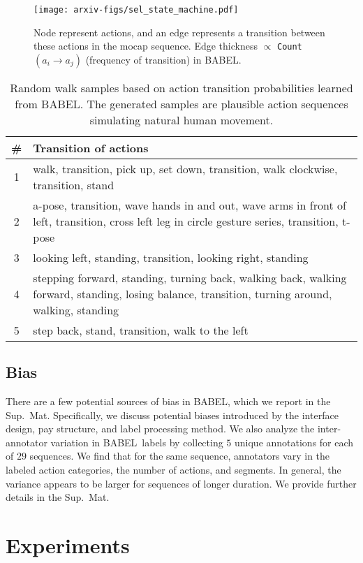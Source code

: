 \documentclass[final]{cvpr}
\def\babel{BABEL}
\begin{document}
\begin{figure}[t!]
    \centering
    \texttt{[image: arxiv-figs/sel\_state\_machine.pdf]}
    \caption{
        Node represent actions, and an edge represents a transition between these actions in the mocap sequence. 
        Edge thickness $\propto$ \texttt{Count}$(a_i \rightarrow a_j)$ (frequency of transition) in \babel. 
    }
    \label{fig:state_machine}
\end{figure}

\begin{table}[t]
    \centering
    \begin{tabular}{c|p{7cm}}
        \hline
         \# & Transition of actions \\
        \hline
        1 & walk, transition, pick up, set down, transition, walk clockwise, transition, stand \\ 
        2 & a-pose, transition, wave hands in and out, wave arms in front of left, transition, cross left leg in circle gesture series, transition, t-pose \\ 
        3 &  looking left, standing, transition, looking right, standing \\
        4 & stepping forward, standing, turning back, walking back, walking forward, standing, losing balance, transition, turning around, walking, standing \\
        5 & step back, stand, transition, walk to the left \\         
        \hline
    \end{tabular}
    \vspace{5pt}    
    \caption{
        Random walk samples based on action transition probabilities learned from \babel. The generated samples are plausible action sequences simulating natural human movement. 
    }
    \label{tab:mm_randomwalk}
\end{table}

\subsection{Bias}
There are a few potential sources of bias in \babel, which we report in the Sup.~Mat. 
Specifically, we discuss potential biases introduced by the interface design, pay structure, and label processing method. 
We also analyze the inter-annotator variation in \babel~labels by collecting $5$ unique annotations for each of $29$ sequences. 
We find that for the same sequence, annotators vary in the labeled action categories, the number of actions, and segments. In general, the variance appears to be larger for sequences of longer duration. We provide further details in the Sup.~Mat.  \section{Experiments}
\end{document}
